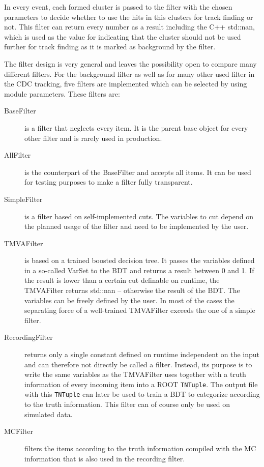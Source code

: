 In every event, each formed cluster is passed to the filter with the chosen parameters to decide whether to use the hits in this clusters for track finding or not. This filter can return every number as a result including the C++ std::nan, which is used as the value for indicating that the cluster should not be used further for track finding as it is marked as background by the filter.

The filter design is very general and leaves the possibility open to compare many different filters. For the background filter as well as for many other used filter in the CDC tracking, five filters are implemented which can be selected by using module parameters. These filters are:

\begin{description}
  \item[BaseFilter] is a filter that neglects every item. It is the parent base object for every other filter and is rarely used in production.
  \item[AllFilter] is the counterpart of the BaseFilter and accepts all items. It can be used for testing purposes to make a filter fully transparent.
  \item[SimpleFilter] is a filter based on self-implemented cuts. The variables to cut depend on the planned usage of the filter and need to be implemented by the user.
  \item[TMVAFilter] is based on a trained boosted decision tree. It passes the variables defined in a so-called VarSet to the BDT and returns a result between 0 and 1. If the result is lower than a certain cut definable on runtime, the TMVAFilter returns std::nan -- otherwise the result of the BDT. The variables can be freely defined by the user. In most of the cases the separating force of a well-trained TMVAFilter exceeds the one of a simple filter.
  \item[RecordingFilter] returns only a single constant defined on runtime independent on the input and can therefore not directly be called a filter. Instead, its purpose is to write the same variables as the TMVAFilter uses together with a truth information of every incoming item into a ROOT \texttt{TNTuple}. The output file with this \texttt{TNTuple} can later be used to train a BDT to categorize according to the truth information. This filter can of course only be used on simulated data.
  \item[MCFilter] filters the items according to the truth information compiled with the MC information that is also used in the recording filter.
\end{description}

